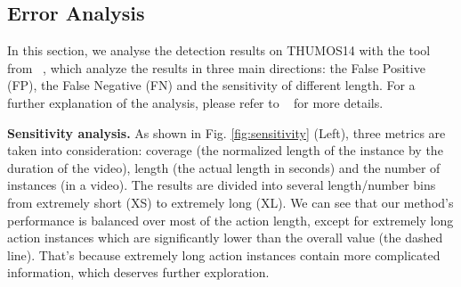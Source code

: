\documentclass[10pt,twocolumn,letterpaper]{article}
\newcommand{\figref}[1]{Fig. \ref{#1}}
\newcommand{\myPara}[1]{\vspace{.05in}\noindent\textbf{#1}}
\begin{document}
\begin{figure*}[t]
\end{figure*}


\subsection{Error Analysis}
In this section, we analyse the detection results on THUMOS14 with the tool from ~\cite{alwassel2018diagnosing}, which analyze the results in three main directions: the False Positive (FP), the False Negative (FN) and the sensitivity of different length. For a further explanation of the analysis, please refer to ~\cite{alwassel2018diagnosing} for more details. 

\myPara{Sensitivity analysis.}
As shown in \figref{fig:sensitivity} (Left), three metrics are taken into consideration: coverage (the normalized length of the instance by the duration of the video), length (the actual length in seconds) and the number of instances (in a video). The results are divided into several length/number bins from extremely short (XS) to extremely long (XL). We can see that our method's performance is balanced over most of the action length, except for extremely long action instances which are significantly lower than the overall value (the dashed line). That's because extremely long action instances contain more complicated information, which deserves further exploration.

\begin{figure}[t!]
\end{figure}


\begin{figure}[t]
\end{figure}
\end{document}
